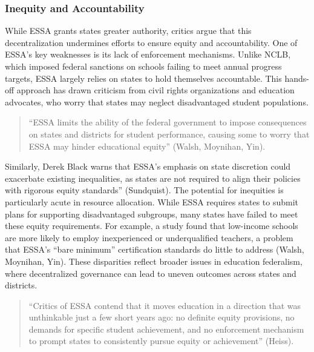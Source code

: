 \documentclass[11pt]{extarticle}
\begin{document}
\subsubsection{Inequity and Accountability}
While ESSA grants states greater authority, critics argue that this decentralization undermines efforts to ensure equity and accountability. One of ESSA’s key weaknesses is its lack of enforcement mechanisms. Unlike NCLB, which imposed federal sanctions on schools failing to meet annual progress targets, ESSA largely relies on states to hold themselves accountable. This hands-off approach has drawn criticism from civil rights organizations and education advocates, who worry that states may neglect disadvantaged student populations.
\begin{quote}
  ``ESSA limits the ability of the federal government to impose consequences on states and districts for student performance, causing some to worry that ESSA may hinder educational equity” (Walsh, Moynihan, Yin). 
\end{quote}
Similarly, Derek Black warns that ESSA’s emphasis on state discretion could exacerbate existing inequalities, as states are not required to align their policies with rigorous equity standards'' (Sundquist). The potential for inequities is particularly acute in resource allocation. While ESSA requires states to submit plans for supporting disadvantaged subgroups, many states have failed to meet these equity requirements. 
For example, a study found that low-income schools are more likely to employ inexperienced or underqualified teachers, a problem that ESSA’s “bare minimum” certification standards do little to address (Walsh, Moynihan, Yin). These disparities reflect broader issues in education federalism, where decentralized governance can lead to uneven outcomes across states and districts.
\begin{quote}
“Critics of ESSA contend that it moves education in a direction that was unthinkable just a few short years ago: no definite equity provisions, no demands for specific student achievement, and no enforcement mechanism to prompt states to consistently pursue equity or achievement” (Heiss).
\end{quote}
\end{document}
